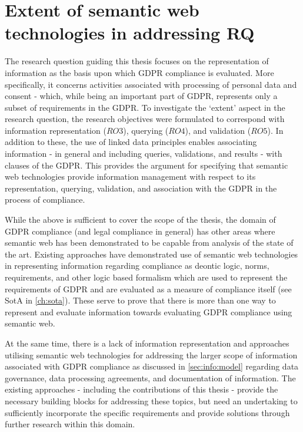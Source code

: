 \section{Extent of semantic web technologies in addressing RQ}
The research question guiding this thesis focuses on the representation of information as the basis upon which GDPR compliance is evaluated.
More specifically, it concerns activities associated with processing of personal data and consent - which, while being an important part of GDPR, represents only a subset of requirements in the GDPR.
To investigate the `extent' aspect in the research question, the research objectives were formulated to correspond with information representation ($RO3$), querying ($RO4$), and validation ($RO5$).
In addition to these, the use of linked data principles enables associating  information - in general and including queries, validations, and results - with clauses of the GDPR.
This provides the argument for specifying that semantic web technologies provide information management with respect to its representation, querying, validation, and association with the GDPR in the process of compliance.

While the above is sufficient to cover the scope of the thesis, the domain of GDPR compliance (and legal compliance in general) has other areas where semantic web has been demonstrated to be capable from analysis of the state of the art.
Existing approaches have demonstrated use of semantic web technologies in representing information regarding compliance as deontic logic, norms, requirements, and other logic based formalism which are used to represent the requirements of GDPR and are evaluated as a measure of compliance itself (see SotA in \autoref{ch:sota}).
These serve to prove that there is more than one way to represent and evaluate information towards evaluating GDPR compliance using semantic web.

At the same time, there is a lack of information representation and approaches utilising semantic web technologies for addressing the larger scope of information associated with GDPR compliance as discussed in \autoref{sec:info:model} regarding data governance, data processing agreements, and documentation of information.
The existing approaches - including the contributions of this thesis - provide the necessary building blocks for addressing these topics, but need an undertaking to sufficiently incorporate the specific requirements and provide solutions through further research within this domain.

